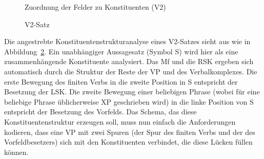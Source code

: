 \begin{figure}[!h]
  \caption{Zuordnung der Felder zu Konstituenten (V2)}
  \label{fig:movev2konstituenten}
\end{figure}

\begin{figure}[h]
  \vspace{0.3cm}
  \caption{V2-Satz}
  \label{fig:v2satz}
\end{figure}


Die angestrebte Konstituentenstrukturanalyse eines V2-Satzes sieht aus wie in Abbildung~\ref{fig:v2satz}.
Ein unabhängiger Aussagesatz (Symbol S) wird hier als eine zusammenhängende Konstituente analysiert.
Das Mf und die RSK ergeben sich automatisch durch die Struktur der Reste der VP und des Verbalkomplexes.
Die erste Bewegung des finiten Verbs in die zweite Position in S entspricht der Besetzung der LSK.
Die zweite Bewegung einer beliebigen Phrase (wobei für eine beliebige Phrase üblicherweise XP geschrieben wird) in die linke Position von S entspricht der Besetzung des Vorfelds.
Das Schema, das diese Konstituentenstruktur erzeugen soll, muss nun einfach die Anforderungen kodieren, dass eine VP mit zwei Spuren (der Spur des finiten Verbs und der des Vorfeldbesetzers) sich mit den Konstituenten verbindet, die diese Lücken füllen können.

